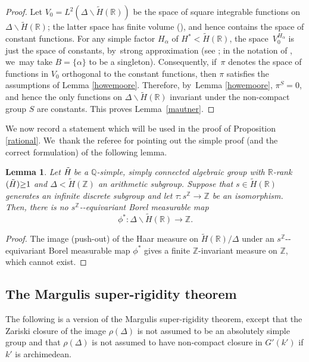 \documentclass[10pt,a4paper]{amsart}
\providecommand{\nobreakdash}{\nobreak\hbox{-}}
\newtheorem{lemma}{Lemma}
\theoremstyle{definition}
\newcommand{\field}[1]{\mathbb{#1}}
\newcommand{\Q}{\field{Q}}
\newcommand{\R}{\field{R}}
\newcommand{\Z}{\field{Z}}
\let\bs\backslash
\begin{document}
\begin{proof} Let $V_0=L^2(\Delta \bs \tilde H(\R))$ be the space of square integrable functions on $\Delta \bs \tilde H(\R)$; the latter space has finite volume (\cite[Th.\,1]{BHC}),
and hence contains the space of constant functions. For any simple factor $H_{\alpha }$ of $H^*< \tilde H(\R)$, the space~$V_0^{H_{\alpha }}$ is just the space of constants, by~strong approximation (see \cite[Chap.\,II, Th.\,(6.7)]{M}; in the notation of \cite{M}, we~may take $B=\{{\alpha \}}$ to be a singleton). Consequently, if~$\pi $ denotes the space of functions in $V_0$ orthogonal to the constant functions, then $\pi $ satisfies the assumptions of Lemma \ref{howemoore}. Therefore, by~Lemma \ref{howemoore}, $\pi ^S=0$, and
hence the only functions on $\Delta \bs \tilde H(\R)$ invariant under the non-compact group $S$ are constants. This proves Lemma~\ref{mautner}.
\end{proof}

We now record a statement which will be used in the proof of Proposition \ref{rational}. We~thank the referee for pointing out the simple proof (and the correct formulation) of the following lemma.\enlargethispage{.5\baselineskip}

\begin{lemma}\label{useful} Let $\tilde{H}\mkern-3mu$ be a $\Q$-simple, simply connected algebraic group with \hbox{$\R$-rank$(\tilde{H})\mkern-5mu\geq\mkern-5mu 1$} and $\Delta <\tilde{H}(\Z)$ an arithmetic subgroup. Suppose that $s\in \tilde{H}(\R)$ generates an infinite discrete subgroup and let
$\tau:s^{\Z}\to \Z$ be an isomorphism. Then, there is no $s^{\Z}$\nobreakdash-equivariant Borel measurable map
\[
\phi^*:\Delta \bs \tilde{H}(\R)\to \Z.
\]
\end{lemma}

\begin{proof} The image (push-out) of the Haar measure on $\tilde{H}(\R)/\Delta$ under an $s^{\Z}$\nobreakdash-equi\-variant Borel measurable map $\phi^*$ gives a finite $\Z$-invariant measure on $\Z$, which cannot exist.
\end{proof}

\subsection{The Margulis super-rigidity theorem} The following is a version of the Margulis super-rigidity theorem, except that the Zariski closure of the image $\rho (\Delta)$ is not assumed to be an absolutely simple group and that $\rho (\Delta)$ is not assumed to have non-compact closure in $G'(k')$ if $k'$ is archimedean.
\end{document}
